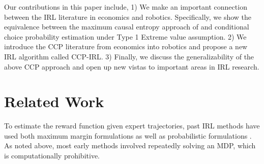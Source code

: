 \documentclass{article}
\begin{document}
Our contributions in this paper include, 1) We make an important connection between the IRL literature in economics and robotics. Specifically, we show the equivalence between the maximum causal entropy approach of \cite{ziebart2010modeling} and \cite{rust_gmc} conditional choice probability estimation under Type 1 Extreme value assumption. 2) We introduce the CCP literature from economics into robotics and propose a new IRL algorithm called CCP-IRL. 3) Finally, we discuss the generalizability of the above CCP approach and open up new vistas to important areas in IRL research.

\section{Related Work}

To estimate the reward function given expert trajectories, past IRL methods have used both maximum margin formulations \cite{abbeel2004apprenticeship, Ratliff2006} as well as probabilistic formulations \cite{ziebart}. As noted above, most early methods involved repeatedly solving an MDP, which is computationally prohibitive.

\end{document}
